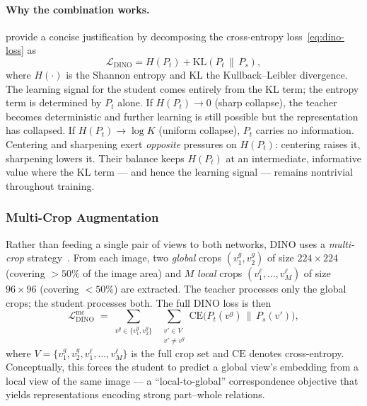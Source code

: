 \documentclass[11pt,a4paper]{article}
\newcommand{\KL}{\mathrm{KL}}
\newcommand{\CE}{\mathrm{CE}}
\newcommand{\loss}{\mathcal{L}}
\newcommand{\PS}{P_{s}}
\newcommand{\PT}{P_{t}}
\begin{document}
\paragraph{Why the combination works.}
\citet{caron2021emerging} provide a concise justification by decomposing the
cross-entropy loss~\eqref{eq:dino-loss} as
\begin{equation}
\loss_{\text{DINO}} = H(\PT) + \KL(\PT \,\|\, \PS),
\end{equation}
where $H(\cdot)$ is the Shannon entropy and $\KL$ the Kullback--Leibler
divergence. The learning signal for the student comes entirely from the KL
term; the entropy term is determined by $\PT$ alone. If
$H(\PT) \to 0$ (sharp collapse), the teacher becomes deterministic and
further learning is still possible but the representation has collapsed.
If $H(\PT) \to \log K$ (uniform collapse), $\PT$ carries no information.
Centering and sharpening exert \emph{opposite} pressures on $H(\PT)$: centering
raises it, sharpening lowers it. Their balance keeps
$H(\PT)$ at an intermediate, informative value where the KL term --- and
hence the learning signal --- remains nontrivial throughout training.

\subsubsection{Multi-Crop Augmentation}
\label{sec:multicrop}

Rather than feeding a single pair of views to both networks, DINO uses a
\emph{multi-crop} strategy~\citep{caron2020unsupervised}. From each image,
two \emph{global} crops $(v_{1}^{g}, v_{2}^{g})$ of size $224\times 224$
(covering $> 50\%$ of the image area) and $M$ \emph{local} crops
$(v_{1}^{\ell},\ldots,v_{M}^{\ell})$ of size $96\times 96$ (covering
$< 50\%$) are extracted. The teacher processes only the global crops; the
student processes both. The full DINO loss is then
\begin{equation}
\loss_{\text{DINO}}^{\text{mc}} \;=\;
\sum_{v^{g}\in\{v_{1}^{g},v_{2}^{g}\}}\;\;
\sum_{\substack{v' \in V \\ v' \neq v^{g}}}
  \CE\!\bigl(\PT(v^{g}) \,\|\, \PS(v')\bigr),
\label{eq:multicrop}
\end{equation}
where $V = \{v_{1}^{g},v_{2}^{g},v_{1}^{\ell},\ldots,v_{M}^{\ell}\}$ is
the full crop set and $\CE$ denotes cross-entropy.
Conceptually, this forces the student to predict a global view's embedding
from a local view of the same image --- a ``local-to-global'' correspondence
objective that yields representations encoding strong part--whole relations.
\end{document}
